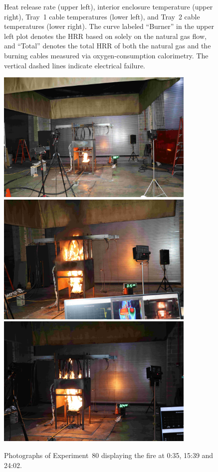 \begin{figure}[H]
\caption[HRR and temperatures of Experiment 80]{Heat release rate (upper left), interior enclosure temperature (upper right), Tray~1 cable temperatures (lower left), and Tray~2 cable temperatures (lower right). The curve labeled ``Burner'' in the upper left plot denotes the HRR based on solely on the natural gas flow, and ``Total'' denotes the total HRR of both the natural gas and the burning cables measured via oxygen-consumption calorimetry. The vertical dashed lines indicate electrical failure.}
\label{fig:Test_80}
\end{figure}

\begin{figure}[p]
\centering
\includegraphics[height=2.50in]{../FIGURES/Test_80_Photo_1} \\ \vspace{0.1in}
\includegraphics[height=2.50in]{../FIGURES/Test_80_Photo_2} \\ \vspace{0.1in}
\includegraphics[height=2.50in]{../FIGURES/Test_80_Photo_3}
\caption[Photographs of Experiment~80]{Photographs of Experiment~80 displaying the fire at 0:35, 15:39 and 24:02.}
\label{fig:Test_80_photos}
\end{figure}


